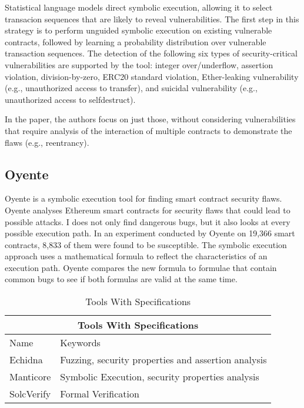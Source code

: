 \documentclass[a4paper,sigconf, language=french,
language=german, language=spanish, language=english]{acmart}
\begin{document}
Statistical language models direct symbolic execution, allowing it to select transacion sequences that are likely to reveal vulnerabilities.
The first step in this strategy is to perform unguided symbolic execution on existing vulnerable contracts, followed by learning a probability 
distribution over vulnerable transaction sequences. The detection of the following six types of security-critical vulnerabilities are supported
by the tool: integer over/underflow, assertion violation, division-by-zero, ERC20 standard
violation, Ether-leaking vulnerability (e.g., unauthorized access to transfer), and suicidal
vulnerability (e.g., unauthorized access to selfdestruct). 

In the paper, the authors focus on
just those, without considering vulnerabilities that require analysis of the interaction of
multiple contracts to demonstrate the flaws (e.g., reentrancy).

\subsection{Oyente}
Oyente is a symbolic execution tool for finding smart contract security flaws.
Oyente analyses Ethereum smart contracts for security flaws that could lead to possible attacks.
I does not only find dangerous bugs, but it also looks at every possible execution path.
In an experiment conducted by Oyente on 19,366 smart contracts, 8,833 of them were found to be susceptible.
The symbolic execution approach uses a mathematical formula to reflect the characteristics of an execution path.
Oyente compares the new formula to formulae that contain common bugs to see if both formulas are valid at the same time. 


\begin{table*}
  \caption{Tools With Specifications}
  \label{TollsWithSpec}
  \begin{tabular}{ |p{5cm}|p{5cm}|  }
    \hline
    \multicolumn{2}{|c|}{Tools With Specifications }\\
    \hline
    Name & Keywords \\
    \hline 
    Echidna  & Fuzzing, security properties and assertion analysis\\
    \hline
    Manticore  & Symbolic Execution, security properties analysis \\
    \hline
    SolcVerify & Formal Verification \\
    \hline
  \end{tabular}
\end{table*}
\end{document}
